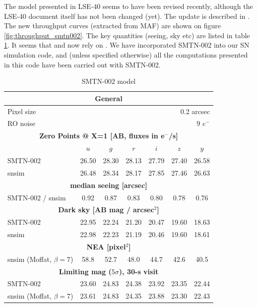 \documentclass[\docopts]{\docclass}
\begin{document}
The model presented in LSE-40 seems to have been revised recently,
although the LSE-40 document itself has not been changed (yet). The
update is described in \cite[][hereafter SMTN-002)]{SMTN-002}.  The
new throughput curves (extracted from MAF) are shown on figure
\ref{fig:throughput_smtn002}.  The key quantities (seeing, sky etc)
are listed in table \ref{tab:smtn002}.  It seems that  and
 now rely on .  We have incorporated SMTN-002
into our  SN simulation code, and (unless specified
otherwise) all the computations presented in this code have been
carried out with SMTN-002.


\begin{table}[t]
\begin{center}
\caption{SMTN-002 model}
\label{tab:smtn002}
\begin{tabular}{l|cccccc}
\hline 
\hline 
\multicolumn{7}{c}{{\bf General}} \\
\hline
Pixel size & \multicolumn{6}{r}{0.2 arcsec} \\
RO noise   & \multicolumn{6}{r}{9 $e^-$}    \\
\hline
\multicolumn{7}{c}{{\bf Zero Points @ X=1 [AB, fluxes in e$^-$/s]}} \\
\hline
           &  $u$ & $g$ & $r$ & $i$ & $z$ & $y$ \\
SMTN-002   & 26.50 & 28.30 & 28.13 & 27.79 & 27.40 & 26.58 \\
snsim      & 26.48 & 28.34 & 28.17 & 27.85 & 27.46 & 26.63 \\
\hline
\multicolumn{7}{c}{{\bf median seeing [arcsec]}} \\
\hline
SMTN-002 / snsim  &  0.92 &  0.87 &  0.83 &  0.80 &  0.78 &  0.76 \\
\hline
\multicolumn{7}{c}{{\bf Dark sky [AB mag / arcsec$^2$]}}   \\
\hline
SMTN-002   & 22.95 & 22.24 & 21.20 & 20.47 & 19.60 & 18.63 \\ %
snsim      & 22.98 & 22.23 & 21.19 & 20.46 & 19.60 & 18.61 \\
\hline
\multicolumn{7}{c}{{\bf NEA [pixel$^2$]}}   \\
\hline
snsim (Moffat, $\beta=7$)     & 58.8  & 52.7  & 48.0  & 44.7  & 42.6  & 40.5  \\
\hline
\multicolumn{7}{c}{{\bf Limiting mag ($5 \sigma$), 30-s visit}}   \\
\hline
SMTN-002                    &  23.60     &  24.83     &  24.38     &   23.92    &  23.35     &  22.44  \\
snsim (Moffat, $\beta=7$)   &  23.61     &  24.83     &  24.35     &   23.88    &  23.30     &  22.43  \\
\hline
\end{tabular}
\end{center}
\end{table}
\end{document}
